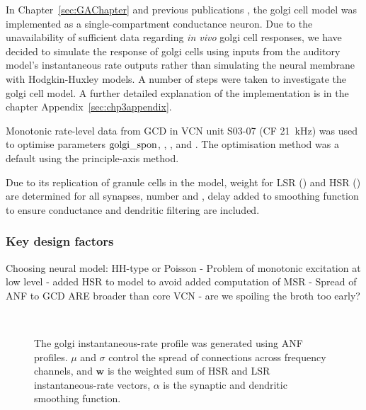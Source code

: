\medskip{}

In Chapter~\ref{sec:GAChapter} and previous publications \citep{EagerGraydenEtAl:2006a}, the golgi cell model was implemented as a single-compartment conductance  neuron. Due to the unavailability of sufficient data regarding \emph{in vivo}
golgi cell responses, we have decided to simulate the response of
golgi cells using inputs from the auditory model's instantaneous rate outputs rather
than simulating the neural membrane with Hodgkin-Huxley models.  A number of steps
were taken to investigate the golgi cell model. A further detailed explanation of the implementation is in the chapter Appendix~\ref{sec:chp3appendix}.

\medskip{}

Monotonic rate-level data from GCD in VCN \citep{GhoshalKim:1996} unit
S03-07 (CF 21~kHz) was used to optimise parameters ${\rm
golgi\_spon}$, \wLSRGLG, \wHSRGLG, and \sANFGLG\@.  The optimisation
method was a default using the principle-axis method.

\medskip{}

Due to its replication of granule cells in the model, weight for LSR (\wLSRGLG) and HSR (\wHSRGLG) are determined for all synapses, number \nLSRDS and \nHSRDS, delay \dANFGLG added to smoothing function to ensure conductance and dendritic filtering are included.

\subsubsection{Key design factors}

Choosing neural model: HH-type or Poisson
 - Problem of monotonic excitation at low level
  - added HSR to model to avoid added computation of MSR
 - Spread of ANF to GCD ARE broader than core VCN
  - are we spoiling the broth too early? 


\begin{figure}[hp!]
  \centering
  \\
  \caption{The golgi instantaneous-rate profile was generated using ANF
    profiles. $\mu$ and $\sigma$ control the spread of connections
    across frequency channels, and $\mathbf{w}$ is
    the weighted sum of HSR and LSR instantaneous-rate vectors,
    $\alpha$ is the synaptic and dendritic smoothing function.}\label{fig:GolgiDiagram}
\end{figure}

